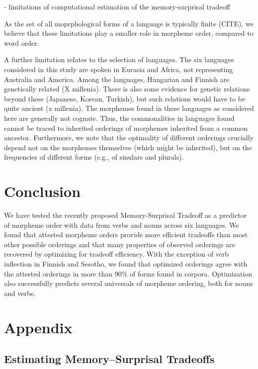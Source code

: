 \documentclass[11pt,letterpaper]{article}
\begin{document}
- limitations of computational estimation of the memory-surprisal tradeoff

As the set of all moprphological forms of a language is typically finite (CITE), we believe that these limitations play a smaller role in morpheme order, compared to word order.


A further limitation relates to the selection of languages.
The six languages considered in this study are spoken in Eurasia and Africa, not representing Australia and America.
Among the languages, Hungarian and Finnish are genetically related (X millenia).
There is also some evidence for genetic relations beyond these (Japanese, Korean, Turkish), but such relations would have to be quite ancient (x millenia).
The morphemes found in these languages as considered here are generally not cognate.
Thus, the commonalities in languages found cannot be traced to inherited orderings of morphemes inherited from a common ancestor.
Furthermore, we note that the optimality of different orderings crucially depend not on the morphemes themselves (which might be inherited), but on the frequencies of different forms (e.g., of sinulars and plurals).



\section{Conclusion}

We have tested the recently proposed Memory-Surprisal Tradeoff as a predictor of morpheme order with data from verbs and nouns across six languages.
We found that attested morpheme orders provide more efficient tradeoffs than most other possible orderings and that many properties of observed orderings are recovered by optimizing for tradeoff efficiency.
With the exception of verb inflection in Finnish and Sesotho, we found that optimized orderings agree with the attested orderings in more than 90\% of forms found in corpora.
Optimization also successfully predicts several universals of morpheme ordering, both for nouns and verbs.




\appendix

\section{Appendix}


\subsection{Estimating Memory--Surprisal Tradeoffs}
\end{document}
